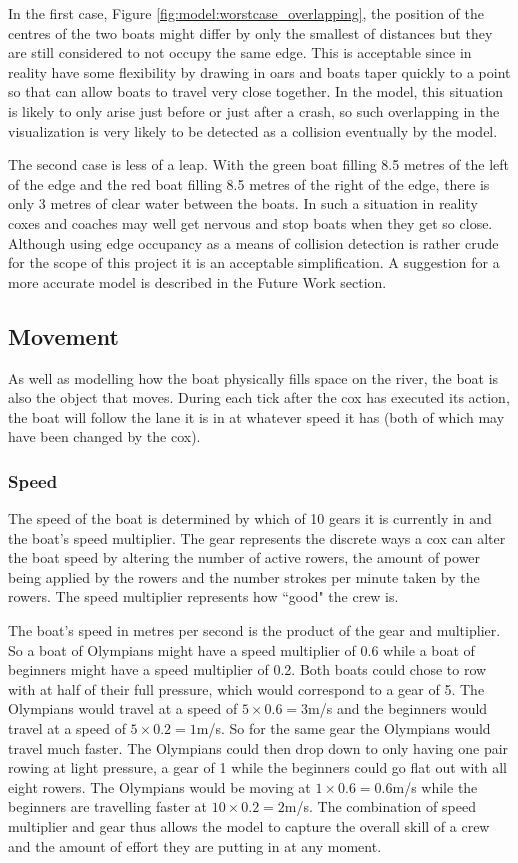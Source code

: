       In the first case, Figure \ref{fig:model:worstcase_overlapping}, the position of the centres of the two boats might differ by only the smallest of distances but they are still considered to not occupy the same edge. This is acceptable since in reality have some flexibility by drawing in oars and boats taper quickly to a point so  that can allow boats to travel very close together. In the model, this situation is likely to only arise just before or just after a crash, so such overlapping in the visualization is very likely to be detected as a collision eventually by the model.
      
      The second case is less of a leap. With the green boat filling 8.5 metres of the left of the edge and the red boat filling 8.5 metres of the right of the edge, there is only 3 metres of clear water between the boats. In such a situation in reality coxes and coaches may well get nervous and stop boats when they get so close. Although using edge occupancy as a means of collision detection is rather crude for the scope of this project it is an acceptable simplification. A suggestion for a more accurate model is described in the Future Work section.
      
      \subsection{Movement}
      As well as modelling how the boat physically fills space on the river, the boat is also the object that moves. During each tick after the cox has executed its action, the boat will follow the lane it is in at whatever speed it has (both of which may have been changed by the cox).
      
      \subsubsection{Speed}
      The speed of the boat is determined by which of 10 gears it is currently in and the boat's speed multiplier. The gear represents the discrete ways a cox can alter the boat speed by altering the number of active rowers, the amount of power being applied by the rowers and the number strokes per minute taken by the rowers. The speed multiplier represents how ``good" the crew is. 
      
      The boat's speed in metres per second is the product of the gear and multiplier. So a boat of Olympians might have a speed multiplier of 0.6 while a boat of beginners might have a speed multiplier of 0.2. Both boats could chose to row with at half of their full pressure, which would correspond to a gear of 5. The Olympians would travel at a speed of $5\times0.6=3$m/s and the beginners would travel at a speed of $5\times0.2=1$m/s. So for the same gear the Olympians would travel much faster. The Olympians could then drop down to only having one pair rowing at light pressure, a gear of 1 while the beginners could go flat out with all eight rowers. The Olympians would be moving at $1\times0.6=0.6$m/s while the beginners are travelling faster at $10\times0.2=2$m/s. The combination of speed multiplier and gear thus allows the model to capture the overall skill of a crew and the amount of effort they are putting in at any moment.
      
